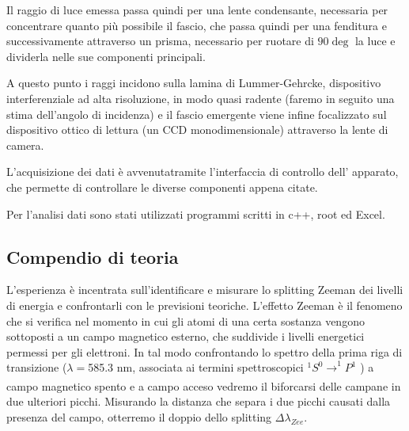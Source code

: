 \documentclass{article}
\begin{document}
Il raggio di luce emessa passa quindi per una lente condensante, necessaria 
per concentrare quanto più possibile il fascio, che passa quindi per una 
fenditura e successivamente attraverso un prisma, necessario per ruotare di 
$90\deg$ la luce e dividerla nelle sue componenti principali. 

A questo punto i raggi incidono sulla lamina di Lummer-Gehrcke, dispositivo
interferenziale ad alta risoluzione, in modo quasi
radente (faremo in seguito una stima dell'angolo di incidenza) e il fascio 
emergente viene infine focalizzato sul dispositivo ottico di lettura (un CCD
monodimensionale) attraverso la lente di camera.


L'acquisizione dei dati è avvenutatramite l'interfaccia di controllo dell'
apparato, che permette di controllare le diverse componenti appena citate.

Per l'analisi dati sono stati utilizzati programmi scritti in c++, root ed Excel.


\subsection*{Compendio di teoria}

L'esperienza è incentrata sull'identificare e misurare lo splitting 
Zeeman dei livelli di energia e confrontarli con le previsioni teoriche.
L'effetto Zeeman è il fenomeno che si verifica nel momento in cui gli
atomi di una certa sostanza vengono sottoposti a un campo magnetico 
esterno, che suddivide i livelli energetici permessi per gli elettroni.
In tal modo confrontando lo spettro della prima riga di transizione 
($\lambda = $585.3 nm, associata ai termini spettroscopici
$^1S^0 \xrightarrow[]{}  ^1P^1$ ) a campo magnetico spento e a campo 
acceso vedremo 
il biforcarsi delle campane in due ulteriori picchi. Misurando la
distanza che separa i due picchi causati dalla presenza del campo,
otterremo il doppio dello splitting $\Delta\lambda_{Zee} $.
\end{document}

